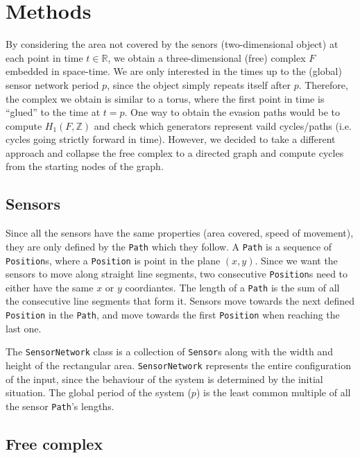 \documentclass{article}
\begin{document}
\section{Methods}

By considering the area not covered by the senors (two-dimensional object) at each point in time $t \in \mathbb{R}$, we obtain a three-dimensional (free) complex $F$ embedded in space-time.
We are only interested in the times up to the (global) sensor network period $p$, since the object simply repeats itself after $p$.
Therefore, the complex we obtain is similar to a torus, where the first point in time is ``glued'' to the time at $t = p$.
One way to obtain the evasion paths would be to compute $ H_1 (F, \mathbb{Z}) $ and check which generators represent vaild cycles/paths (i.e. cycles going strictly forward in time).
However, we decided to take a different approach and collapse the free complex to a directed graph and compute cycles from the starting nodes of the graph.

\subsection{Sensors}

Since all the sensors have the same properties (area covered, speed of movement), they are only defined by the \texttt{Path} which they follow.
A \texttt{Path} is a sequence of \texttt{Position}s, where a \texttt{Position} is point in the plane $(x, y)$.
Since we want the sensors to move along straight line segments, two consecutive \texttt{Position}s need to either have the same $x$ or $y$ coordiantes.
The length of a \texttt{Path} is the sum of all the consecutive line segments that form it.
Sensors move towards the next defined \texttt{Position} in the \texttt{Path}, and move towards the first \texttt{Position} when reaching the last one.

The \texttt{SensorNetwork} class is a collection of \texttt{Sensor}s along with the width and height of the rectangular area.
\texttt{SensorNetwork} represents the entire configuration of the input, since the behaviour of the system is determined by the initial situation.
The global period of the system ($p$) is the least common multiple of all the sensor \texttt{Path}'s lengths.

\subsection{Free complex}
\end{document}
